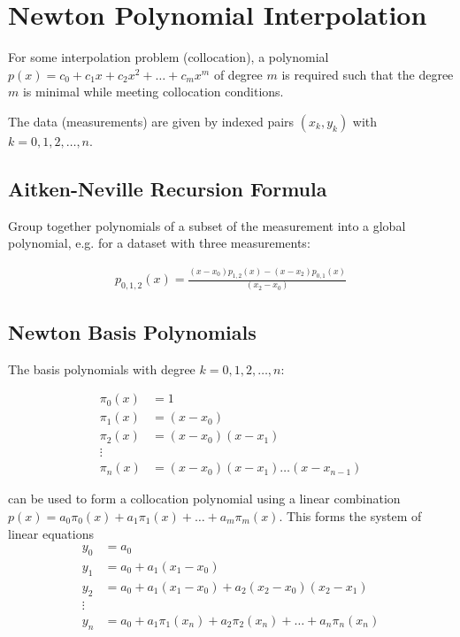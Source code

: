 \section{Newton Polynomial Interpolation}

For some interpolation problem (collocation), a polynomial 
$p(x) = c_0 + c_1x + c_2x^2 + \ldots + c_mx^m$
of degree $m$ is required such that the degree $m$ is minimal while meeting collocation conditions.

The data (measurements) are given by indexed pairs $(x_k,y_k)$ with $k=0,1,2,\ldots,n$.

\subsection{Aitken-Neville Recursion Formula}

Group together polynomials of a subset of the measurement into a global polynomial, e.g. for a dataset with three measurements:

\begin{align*}
	p_{0,1,2}(x)=\frac{(x-x_0)p_{1,2}(x) - (x-x_2)p_{0,1}(x)}{(x_2-x_0)}
\end{align*}

\subsection{Newton Basis Polynomials}

The basis polynomials with degree $k=0,1,2,\ldots,n$:

\begin{snugshade*}
	\begin{align*}
		\pi_0(x) & = 1 \\
		\pi_1(x) & = (x-x_0) \\ 
		\pi_2(x) & = (x-x_0)(x-x_1) \\
		\vdots \\
		\pi_n(x) & = (x-x_0)(x-x_1)\ldots(x-x_{n-1})
	\end{align*}
\end{snugshade*}

can be used to form a collocation polynomial using a linear combination 
$p(x)=a_0\pi_0(x) + a_1\pi_1(x) + \ldots + a_m\pi_m(x)$. 
This forms the system of linear equations
\begin{align*}
	y_0 & = a_0 \\
	y_1 & = a_0 + a_1(x_1-x_0) \\
	y_2 & = a_0 + a_1(x_1-x_0) + a_2(x_2-x_0)(x_2-x_1) \\
	\vdots \\
	y_n & = a_0+a_1\pi_1(x_n)+a_2\pi_2(x_n)+\ldots+a_n\pi_n(x_n)
\end{align*}

